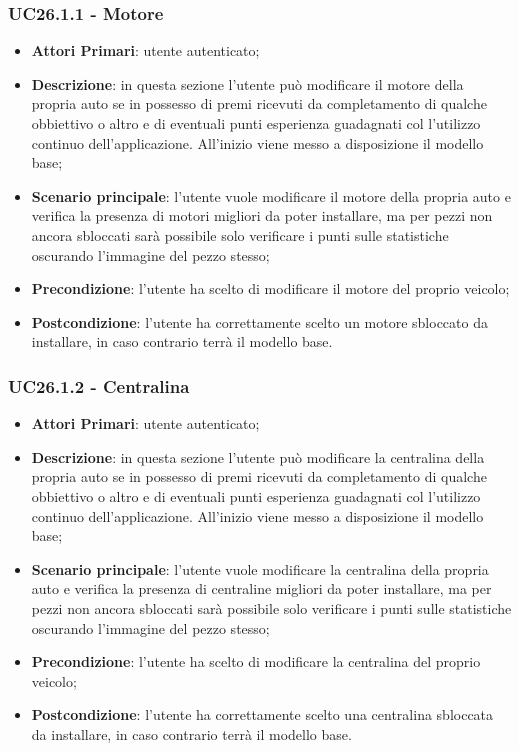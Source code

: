 \subsubsection{UC26.1.1 - Motore}
\begin{itemize}
	\item \textbf{Attori Primari}: utente autenticato;
	\item \textbf{Descrizione}: in questa sezione l'utente può modificare il motore della propria auto se in possesso di premi ricevuti da completamento di qualche obbiettivo o altro e di eventuali punti esperienza guadagnati col l'utilizzo continuo dell'applicazione.
	All'inizio viene messo a disposizione il modello base;
	\item \textbf{Scenario principale}: l'utente vuole modificare il motore della propria auto e verifica la presenza di motori migliori da poter installare, ma per pezzi non ancora sbloccati sarà possibile solo verificare i punti sulle statistiche oscurando l'immagine del pezzo stesso;
	\item \textbf{Precondizione}: l'utente ha scelto di modificare il motore del proprio veicolo; 
	\item \textbf{Postcondizione}: l'utente ha correttamente scelto un motore sbloccato da installare, in caso contrario terrà il modello base.
\end{itemize}
\subsubsection{UC26.1.2 - Centralina}
\begin{itemize}
	\item \textbf{Attori Primari}: utente autenticato;
	\item \textbf{Descrizione}: in questa sezione l'utente può modificare la centralina della propria auto se in possesso di premi ricevuti da completamento di qualche obbiettivo o altro e di eventuali punti esperienza guadagnati col l'utilizzo continuo dell'applicazione.
	All'inizio viene messo a disposizione il modello base;
	\item \textbf{Scenario principale}: l'utente vuole modificare la centralina della propria auto e verifica la presenza di centraline migliori da poter installare, ma per pezzi non ancora sbloccati sarà possibile solo verificare i punti sulle statistiche oscurando l'immagine del pezzo stesso;
	\item \textbf{Precondizione}: l'utente ha scelto di modificare la centralina del proprio veicolo; 
	\item \textbf{Postcondizione}: l'utente ha correttamente scelto una centralina sbloccata da installare, in caso contrario terrà il modello base.
\end{itemize}
